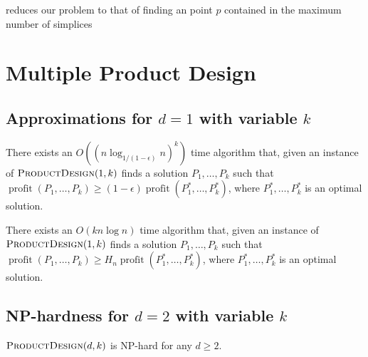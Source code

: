 \documentclass[lotsofwhite]{patmorin}
\newcommand{\val}{\operatorname{profit}}
\newcommand{\eps}{\epsilon}
\begin{document}
 reduces our problem to that of finding an
point $p$ contained in the maximum number of simplices 



\section{Multiple Product Design}

\subsection{Approximations for $d=1$ with variable $k$}

\begin{thm}
There exists an $O((n\log_{1/(1-\eps)} n)^k)$ time algorithm that,
given an instance of $\textsc{ProductDesign}(1,k)$ finds a solution
$P_1,\ldots,P_k$ such that $\val(P_1,\ldots,P_k) \ge
(1-\eps)\val(P_1^*,\ldots,P_k^*)$, where $P_1^*,\ldots,P_k^*$ is
an optimal solution.
\end{thm}


\begin{thm}
There exists an $O(kn\log n)$ time algorithm that,
given an instance of $\textsc{ProductDesign}(1,k)$ finds a solution
$P_1,\ldots,P_k$ such that $\val(P_1,\ldots,P_k) \ge
H_n\val(P_1^*,\ldots,P_k^*)$, where $P_1^*,\ldots,P_k^*$ is
an optimal solution.
\end{thm}

\subsection{NP-hardness for $d=2$ with variable $k$}

\begin{thm}
  $\textsc{ProductDesign}(d,k)$ is NP-hard for any $d\ge 2$.
\end{thm}
\end{document}
